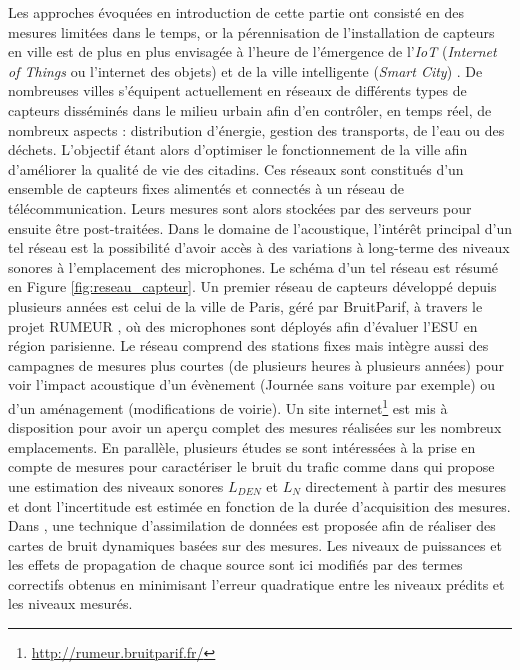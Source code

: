 Les approches évoquées en introduction de cette partie ont consisté en des mesures limitées dans le temps, or la pérennisation de l'installation de capteurs en ville est de plus en plus envisagée à l'heure de l'émergence de l'\textit{IoT} (\textit{Internet of Things} ou l'internet des objets) \cite{zanella2014internet} et de la ville intelligente (\textit{Smart City}) \cite{chourabi2012understanding}. De nombreuses villes s'équipent actuellement en réseaux de différents types de capteurs disséminés dans le milieu urbain afin d'en contrôler, en temps réel, de nombreux aspects : distribution d'énergie, gestion des transports, de l'eau ou des déchets. L'objectif étant alors d'optimiser le fonctionnement de la ville afin d'améliorer la qualité de vie des citadins.
Ces réseaux sont constitués d'un ensemble de capteurs fixes alimentés et connectés à un réseau de télécommunication. Leurs mesures sont alors stockées par des serveurs pour ensuite être post-traitées. Dans le domaine de l'acoustique, l'intérêt principal d'un tel réseau est la possibilité d'avoir accès à des variations à long-terme des niveaux sonores à l'emplacement des microphones. Le schéma d'un tel réseau est résumé en Figure \ref{fig:reseau_capteur}.
Un premier réseau de capteurs développé depuis plusieurs années est celui de la ville de Paris, géré par BruitParif, à travers le projet RUMEUR \cite{mietlicki2012innovative}, où des microphones sont déployés afin d'évaluer l'ESU en région parisienne. Le réseau comprend des stations fixes mais intègre aussi des campagnes de mesures plus courtes (de plusieurs heures à plusieurs années) pour voir l'impact acoustique d'un évènement (\og Journée sans voiture \fg{} par exemple) ou d'un aménagement (modifications de voirie). Un site internet\footnote{\url{http://rumeur.bruitparif.fr/}} est mis à disposition pour avoir un aperçu complet des mesures réalisées sur les nombreux emplacements.
En parallèle, plusieurs études se sont intéressées à la prise en compte de mesures pour caractériser le bruit du trafic comme dans \cite{makarewicz_empirical_2011} qui propose une estimation des niveaux sonores $L_{DEN}$ et $L_N$ directement à partir des mesures et dont l'incertitude est estimée en fonction de la durée d'acquisition des mesures. Dans \cite{wei_dynamic_2016}, une technique d'assimilation de données est proposée afin de réaliser des cartes de bruit dynamiques basées sur des mesures. Les niveaux de puissances et les effets de propagation de chaque source sont ici modifiés par des termes correctifs obtenus en minimisant l'erreur quadratique entre les niveaux prédits et les niveaux mesurés.

